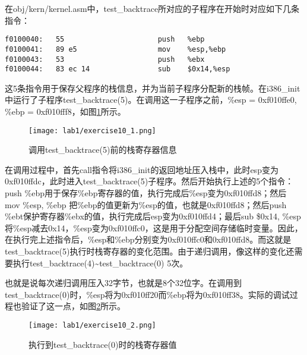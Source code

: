 \begin{exerciseSolution}{10}
\par 在obj/kern/kernel.asm中，test\_backtrace所对应的子程序在开始时对应如下几条指令：
\begin{lstlisting}
f0100040:	55                   	push   %ebp
f0100041:	89 e5                	mov    %esp,%ebp
f0100043:	53                   	push   %ebx
f0100044:	83 ec 14             	sub    $0x14,%esp
\end{lstlisting}
\par 这5条指令用于保存父程序的栈信息，并为当前子程序分配新的栈帧。在i386\_init中运行了子程序test\_backtrace(5)。在调用这一子程序之前，\%esp = 0xf010ffe0, \%ebp = 0xf010fff8，如图\ref{fig:exercise10_1}所示。
\begin{figure}[htb]
    \centering
    \texttt{[image: lab1/exercise10\_1.png]}
    \caption{调用test\_backtrace(5)前的栈寄存器信息}
    \label{fig:exercise10_1}
\end{figure}
\par 在调用过程中，首先call指令将i386\_init的返回地址压入栈中，此时esp变为0xf010ffdc，此时进入test\_backtrace(5)子程序。然后开始执行上述的5个指令：push \%ebp用于保存\%ebp寄存器的值，执行完成后\%esp变为0xf010ffd8；然后 mov \%esp, \%ebp 把\%ebp的值更新为\%esp的值，也就是0xf010ffd8；然后push \%ebt保护寄存器\%ebx的值，执行完成后esp变为0xf010ffd4；最后sub \$0x14, \%esp将\%esp减去0x14，\%esp变为0xf010ffc0，这是用于分配空间存储临时变量。因此，在执行完上述指令后，\%esp和\%ebp分别变为0xf010ffc0和0xf010ffd8。而这就是test\_backtrace(5)执行时栈寄存器的变化范围。由于递归调用，像这样的变化还需要执行test\_backtrace(4)\textasciitilde test\_backtrace(0) 5次。
\par 也就是说每次递归调用压入32字节，也就是8个32位字。在调用到test\_backtrace(0)时，\%esp将为0xf010ff20而\%ebp将为0xf010ff38。实际的调试过程也验证了这一点，如图\ref{fig:exercise10_2}所示。
\begin{figure}[htb]
    \centering
    \texttt{[image: lab1/exercise10\_2.png]}
    \caption{执行到test\_backtrace(0)时的栈寄存器值}
    \label{fig:exercise10_2}
\end{figure}
\FloatBarrier
\end{exerciseSolution}

